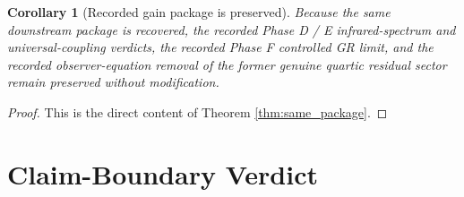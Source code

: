 \documentclass[11pt]{article}
\newtheorem{corollary}{Corollary}
\begin{document}
\begin{corollary}[Recorded gain package is preserved]
\label{cor:gains}
Because the same downstream package is recovered, the recorded Phase D / E infrared-spectrum and universal-coupling verdicts, the recorded Phase F controlled GR limit, and the recorded observer-equation removal of the former genuine quartic residual sector remain preserved without modification.
\end{corollary}

\begin{proof}
This is the direct content of Theorem \ref{thm:same_package}.
\end{proof}

\section{Claim-Boundary Verdict}
\end{document}
